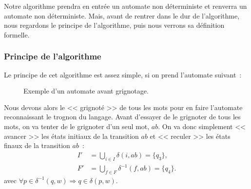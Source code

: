 Notre algorithme prendra en entrée un automate non déterministe et renverra un
automate non déterministe. Mais, avant de rentrer dans le dur de l'algorithme,
nous regardons le principe de l'algorithme, puis nous verrons sa définition
formelle.

\subsubsection{Principe de l'algorithme}

Le principe de cet algorithme est assez simple, si on prend l'automate 
suivant~:
\begin{figure}[H]
  \centering
  \captionsetup{type=figure,justification=centering}
  \caption{Exemple d'un automate avant grignotage.}
\end{figure}

Nous devons alors le << grignoté >> de tous les mots pour en faire l'automate
reconnaissant le trognon du langage. Avant d'essayer de le grignoter de tous
les mots, on va tenter de le grignoter d'un seul mot, \(ab\). On va donc
simplement << avancer >> les états initiaux de la transition \(ab\) et 
<< reculer >> les états finaux de la transition \(ab\)~:
\begin{align*}
  I' &= \bigcup_{i \in I} \delta(i, ab) = \{q_3\}, \\
  F' &= \bigcup_{f \in F} \delta^{-1}(f, ab) = \{q_4\}.
\end{align*}
avec \(\forall p \in \delta^{-1}(q, w) \Longrightarrow q \in
\delta(p, w)\).

\vphantom{}

